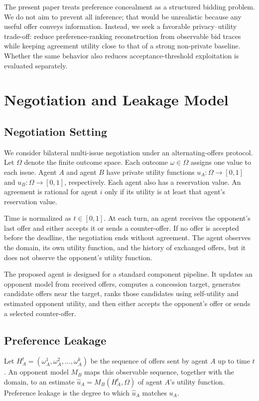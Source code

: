 \documentclass[runningheads]{llncs}
\begin{document}
The present paper treats preference concealment as a structured bidding problem. We do not aim to prevent all inference; that would be unrealistic because any useful offer conveys information. Instead, we seek a favorable privacy--utility trade-off: reduce preference-ranking reconstruction from observable bid traces while keeping agreement utility close to that of a strong non-private baseline. Whether the same behavior also reduces acceptance-threshold exploitation is evaluated separately.

\section{Negotiation and Leakage Model}
\label{sec:model}

\subsection{Negotiation Setting}

We consider bilateral multi-issue negotiation under an alternating-offers protocol. Let $\Omega$ denote the finite outcome space. Each outcome $\omega \in \Omega$ assigns one value to each issue. Agent $A$ and agent $B$ have private utility functions $u_A: \Omega \rightarrow [0,1]$ and $u_B: \Omega \rightarrow [0,1]$, respectively. Each agent also has a reservation value. An agreement is rational for agent $i$ only if its utility is at least that agent's reservation value.

Time is normalized as $t \in [0,1]$. At each turn, an agent receives the opponent's last offer and either accepts it or sends a counter-offer. If no offer is accepted before the deadline, the negotiation ends without agreement. The agent observes the domain, its own utility function, and the history of exchanged offers, but it does not observe the opponent's utility function.

The proposed agent is designed for a standard component pipeline. It updates an opponent model from received offers, computes a concession target, generates candidate offers near the target, ranks those candidates using self-utility and estimated opponent utility, and then either accepts the opponent's offer or sends a selected counter-offer.

\subsection{Preference Leakage}

Let $H_A^t = (\omega_A^1,\omega_A^2,\ldots,\omega_A^k)$ be the sequence of offers sent by agent $A$ up to time $t$. An opponent model $M_B$ maps this observable sequence, together with the domain, to an estimate $\hat{u}_A = M_B(H_A^t,\Omega)$ of agent $A$'s utility function. Preference leakage is the degree to which $\hat{u}_A$ matches $u_A$.
\end{document}
